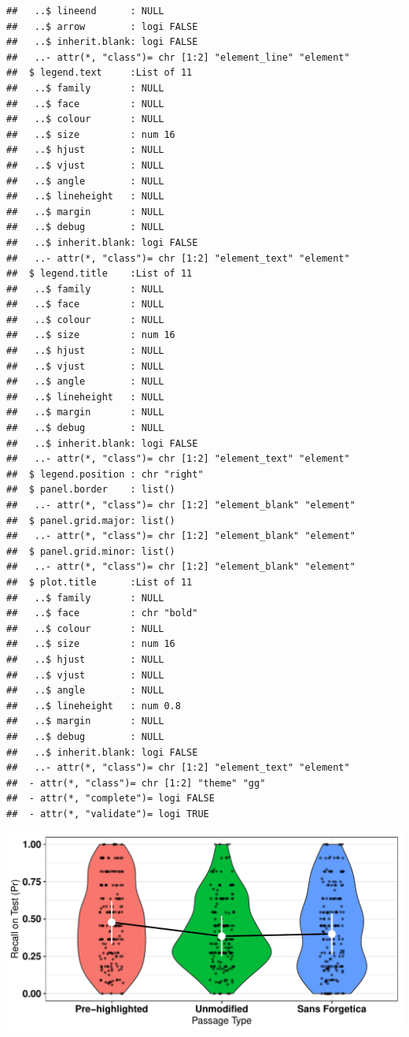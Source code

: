 \documentclass[doc]{apa6}
\begin{document}
\begin{verbatim}
##   ..$ lineend      : NULL
##   ..$ arrow        : logi FALSE
##   ..$ inherit.blank: logi FALSE
##   ..- attr(*, "class")= chr [1:2] "element_line" "element"
##  $ legend.text     :List of 11
##   ..$ family       : NULL
##   ..$ face         : NULL
##   ..$ colour       : NULL
##   ..$ size         : num 16
##   ..$ hjust        : NULL
##   ..$ vjust        : NULL
##   ..$ angle        : NULL
##   ..$ lineheight   : NULL
##   ..$ margin       : NULL
##   ..$ debug        : NULL
##   ..$ inherit.blank: logi FALSE
##   ..- attr(*, "class")= chr [1:2] "element_text" "element"
##  $ legend.title    :List of 11
##   ..$ family       : NULL
##   ..$ face         : NULL
##   ..$ colour       : NULL
##   ..$ size         : num 16
##   ..$ hjust        : NULL
##   ..$ vjust        : NULL
##   ..$ angle        : NULL
##   ..$ lineheight   : NULL
##   ..$ margin       : NULL
##   ..$ debug        : NULL
##   ..$ inherit.blank: logi FALSE
##   ..- attr(*, "class")= chr [1:2] "element_text" "element"
##  $ legend.position : chr "right"
##  $ panel.border    : list()
##   ..- attr(*, "class")= chr [1:2] "element_blank" "element"
##  $ panel.grid.major: list()
##   ..- attr(*, "class")= chr [1:2] "element_blank" "element"
##  $ panel.grid.minor: list()
##   ..- attr(*, "class")= chr [1:2] "element_blank" "element"
##  $ plot.title      :List of 11
##   ..$ family       : NULL
##   ..$ face         : chr "bold"
##   ..$ colour       : NULL
##   ..$ size         : num 16
##   ..$ hjust        : NULL
##   ..$ vjust        : NULL
##   ..$ angle        : NULL
##   ..$ lineheight   : num 0.8
##   ..$ margin       : NULL
##   ..$ debug        : NULL
##   ..$ inherit.blank: logi FALSE
##   ..- attr(*, "class")= chr [1:2] "element_text" "element"
##  - attr(*, "class")= chr [1:2] "theme" "gg"
##  - attr(*, "complete")= logi FALSE
##  - attr(*, "validate")= logi TRUE
\end{verbatim}

\includegraphics{SF_Paper_files/figure-latex/unnamed-chunk-3-1.pdf}
\end{document}
